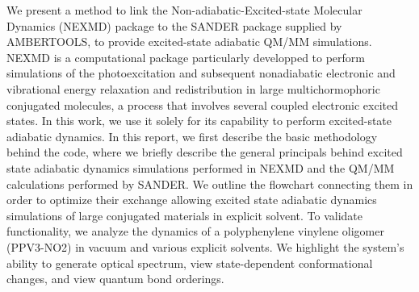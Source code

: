 We present a method to link the Non-adiabatic-Excited-state Molecular Dynamics (NEXMD) package to the SANDER package supplied by AMBERTOOLS, to provide excited-state adiabatic QM/MM simulations.
NEXMD is a computational package particularly developped to perform simulations of the photoexcitation and subsequent nonadiabatic electronic and vibrational energy relaxation and redistribution in large multichormophoric conjugated molecules, a process that involves several coupled electronic excited states.
In this work, we use it solely for its capability to perform excited-state adiabatic dynamics.
In this report, we first describe the basic methodology behind the code, where we briefly describe the general principals behind excited state adiabatic dynamics simulations performed in NEXMD and the QM/MM calculations performed by SANDER.
We outline the flowchart connecting them in order to optimize their exchange allowing excited state adiabatic dynamics simulations of large conjugated materials in explicit solvent.
To validate functionality, we analyze the dynamics of a polyphenylene vinylene oligomer (PPV3-NO2) in vacuum and various explicit solvents.
We highlight the system's ability to generate optical spectrum, view state-dependent conformational changes, and view quantum bond orderings.
